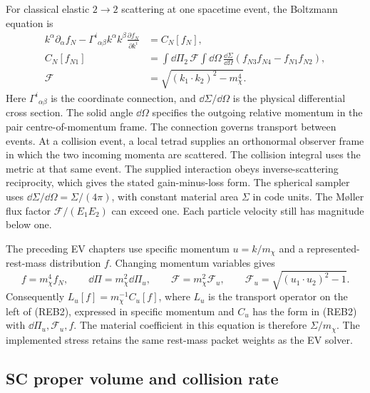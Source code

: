 For classical elastic \(2\to2\) scattering at one spacetime event, the
Boltzmann equation is
\[
 \begin{split}
 k^\alpha\partial_\alpha f_N
 -\Gamma^i{}_{\alpha\beta}k^\alpha k^\beta
       \frac{\partial f_N}{\partial k^i}
 &=C_N[f_N],\\
 C_N[f_{N1}]&=\int\dd\Pi_2\,\mathcal F
   \int\dd\Omega\,\frac{\dd\Sigma}{\dd\Omega}
       (f_{N3}f_{N4}-f_{N1}f_{N2}),\\
 \mathcal F&=\sqrt{(k_1\cdot k_2)^2-m_\chi^4}.
 \end{split}\tag{REB2}
\]
Here \(\Gamma^i{}_{\alpha\beta}\) is the coordinate connection, and
\(\dd\Sigma/\dd\Omega\) is the physical differential cross section. The solid angle \(\dd\Omega\)
specifies the outgoing relative momentum in the pair centre-of-momentum frame.
The connection governs transport between events. At a collision event, a
local tetrad supplies an orthonormal observer frame in which the two incoming
momenta are scattered. The collision integral uses the metric at that same
event. The supplied
interaction obeys inverse-scattering reciprocity, which gives the stated
gain-minus-loss form. The spherical sampler uses
\(\dd\Sigma/\dd\Omega=\Sigma/(4\pi)\), with constant material area
\(\Sigma\) in code units. The M\o ller flux factor
\(\mathcal F/(E_1E_2)\) can exceed one. Each particle velocity still
has magnitude below one.

The preceding EV chapters use specific momentum \(u=k/m_\chi\) and a
represented-rest-mass distribution \(f\). Changing momentum variables
gives
\[
 f=m_\chi^4 f_N,\qquad
 \dd\Pi=m_\chi^2\dd\Pi_u,\qquad
 \mathcal F=m_\chi^2\mathcal F_u,\qquad
 \mathcal F_u=\sqrt{(u_1\cdot u_2)^2-1}.
 \tag{REB3}
\]
Consequently \(L_u[f]=m_\chi^{-1}C_u[f]\), where \(L_u\) is the
transport operator on the left of (REB2), expressed in specific momentum and \(C_u\) has the form in (REB2)
with \(\dd\Pi_u,\mathcal F_u,f\). The material coefficient in this
equation is therefore \(\Sigma/m_\chi\). The implemented stress retains
the same rest-mass packet weights as the EV solver.

\subsection{SC proper volume and collision rate}

